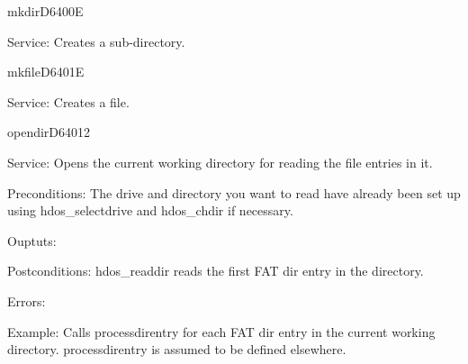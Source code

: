\newpage
\begin{hyppotrap}{mkdir}{D640}{0E}
\item [Service:]
  Creates a sub-directory.
\notimplemented
\end{hyppotrap}


\begin{hyppotrap}{mkfile}{D640}{1E}
\item [Service:]
  Creates a file.
\notimplemented
\end{hyppotrap}


\newpage
\begin{hyppotrap}{opendir}{D640}{12}
\item [Service:]
  Opens the current working directory for reading the file entries in it.
\item [Preconditions:]
  The drive and directory you want to read have already been set up using
  hdos\_selectdrive and hdos\_chdir if necessary.
\item [Ouptuts:]
\item [Postconditions:]
  hdos\_readdir reads the first FAT dir entry in the directory.
\item [Errors:]
\item [Example:]
  Calls processdirentry for each FAT dir entry in the current working directory.
  processdirentry is assumed to be defined elsewhere.

  \TODO
\end{hyppotrap}


